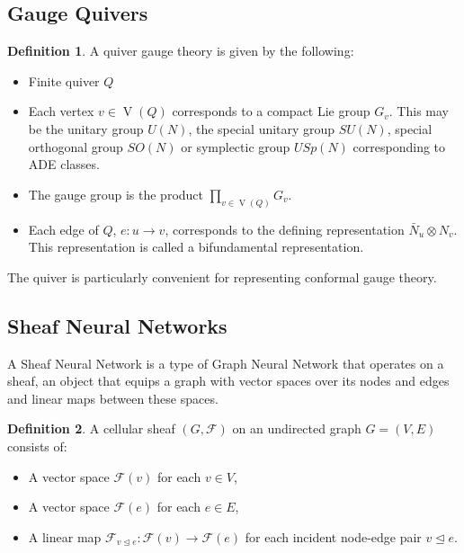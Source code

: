 \documentclass{article}
\theoremstyle{definition}
\newtheorem{definition}{Definition}[section]
\begin{document}

\subsection{Gauge Quivers}
\label{sec:gauge-quiver}

\begin{definition}
    A quiver gauge theory is given by the following:
\begin{itemize}
    \item Finite quiver $Q$
    \item Each vertex  $v\in \operatorname {V} (Q)$ corresponds to a compact Lie group $G_{v}$. This may be the unitary group $U(N)$, the special unitary group $SU(N)$, special orthogonal group $SO(N)$ or symplectic group $USp(N)$ corresponding to ADE classes.
    \item The gauge group is the product $\textstyle \prod _{v\in \operatorname {V} (Q)}G_{v}$.
    \item Each edge of $Q$, $ e\colon u\to v$, corresponds to the defining representation ${\bar {N}}_{u}\otimes N_{v}$. This representation is called a bifundamental representation.
\end{itemize}
\end{definition}

The quiver is particularly convenient for representing conformal gauge theory.


\subsection{Sheaf Neural Networks}
\label{sec:sheaf-nn}

A Sheaf Neural Network is a type of Graph Neural Network that operates on a sheaf, an object that equips a graph with vector spaces over its nodes and edges and linear maps between these spaces.

\begin{definition}
A cellular sheaf $(G, \mathcal{F})$ on an undirected
graph $G = (V, E)$ consists of:
\begin{itemize}
    \item  A vector space $\mathcal{F}(v)$ for each $v \in V$,
    \item  A vector space $\mathcal{F}(e)$ for each $e  \in E$,
    \item A linear map $\mathcal{F}_{v \unlhd e} : \mathcal{F}(v) \to \mathcal{F}(e)$ for each incident node-edge pair $v \unlhd e$.
\end{itemize}
\end{definition}
\end{document}
